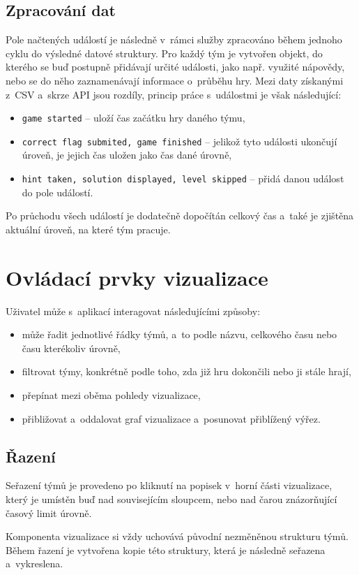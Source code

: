 \documentclass[
  digital, %
  oneside, %
  table,   %
  nolof,     %
  nolot,     %
  nocover
]{fithesis3}
\begin{document}
\subsection{Zpracování dat}
Pole načtených událostí je následně v~rámci služby zpracováno během jednoho cyklu do výsledné datové struktury. Pro každý tým je vytvořen objekt, do kterého se buď postupně přidávají určité události, jako např. využité nápovědy, nebo se do něho zaznamenávají informace o~průběhu hry. Mezi daty získanými z~CSV a~skrze API jsou rozdíly, princip práce s~událostmi je však následující:
\begin{itemize}
  \item \verb|game started| – uloží čas začátku hry daného týmu,
  \item \verb|correct flag submited, game finished| – jelikož tyto události ukončují úroveň, je jejich čas uložen jako čas dané úrovně,
  \item \verb|hint taken, solution displayed, level skipped| – přidá danou událost do pole událostí.
\end{itemize}
Po průchodu všech událostí je dodatečně dopočítán celkový čas a~také je zjištěna aktuální úroveň, na které tým pracuje.

\section{Ovládací prvky vizualizace} \label{interaction}
Uživatel může s~aplikací interagovat následujícími způsoby:
\begin{itemize}
  \item může řadit jednotlivé řádky týmů, a~to podle názvu, celkového času nebo času kterékoliv úrovně,
  \item filtrovat týmy, konkrétně podle toho, zda již hru dokončili nebo ji stále hrají,
  \item přepínat mezi oběma pohledy vizualizace,
  \item přibližovat a~oddalovat graf vizualizace a~posunovat přiblížený výřez.
\end{itemize}

\subsection{Řazení}
Seřazení týmů je provedeno po kliknutí na popisek v~horní části vizualizace, který je umístěn buď nad souvisejícím sloupcem, nebo nad čarou znázorňující časový limit úrovně.\par
Komponenta vizualizace si vždy uchovává původní nezměněnou strukturu týmů. Během řazení je vytvořena kopie této struktury, která je následně seřazena a~vykreslena.
\end{document}
